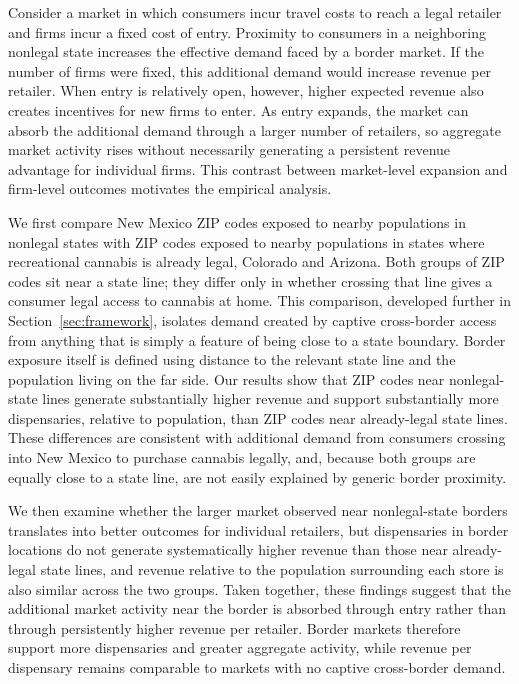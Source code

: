 \documentclass[english,12pt]{article}
\begin{document}
Consider a market in which consumers incur travel costs to reach a legal retailer and firms incur a fixed cost of entry. Proximity to consumers in a neighboring nonlegal state increases the effective demand faced by a border market. If the number of firms were fixed, this additional demand would increase revenue per retailer. When entry is relatively open, however, higher expected revenue also creates incentives for new firms to enter. As entry expands, the market can absorb the additional demand through a larger number of retailers, so aggregate market activity rises without necessarily generating a persistent revenue advantage for individual firms. This contrast between market-level expansion and firm-level outcomes motivates the empirical analysis.

We first compare New Mexico ZIP codes exposed to nearby populations in nonlegal states with ZIP codes exposed to nearby populations in states where recreational cannabis is already legal, Colorado and Arizona. Both groups of ZIP codes sit near a state line; they differ only in whether crossing that line gives a consumer legal access to cannabis at home. This comparison, developed further in Section~\ref{sec:framework}, isolates demand created by captive cross-border access from anything that is simply a feature of being close to a state boundary. Border exposure itself is defined using distance to the relevant state line and the population living on the far side. Our results show that ZIP codes near nonlegal-state lines generate substantially higher revenue and support substantially more dispensaries, relative to population, than ZIP codes near already-legal state lines. These differences are consistent with additional demand from consumers crossing into New Mexico to purchase cannabis legally, and, because both groups are equally close to a state line, are not easily explained by generic border proximity.

We then examine whether the larger market observed near nonlegal-state borders translates into better outcomes for individual retailers, but dispensaries in border locations do not generate systematically higher revenue than those near already-legal state lines, and revenue relative to the population surrounding each store is also similar across the two groups. Taken together, these findings suggest that the additional market activity near the border is absorbed through entry rather than through persistently higher revenue per retailer. Border markets therefore support more dispensaries and greater aggregate activity, while revenue per dispensary remains comparable to markets with no captive cross-border demand.
\end{document}
